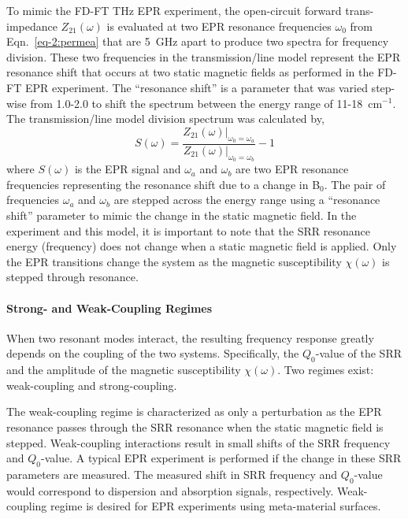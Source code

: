 To mimic the FD-FT THz EPR experiment, the open-circuit forward trans-impedance $Z_{21}(\omega)$ is evaluated at two EPR resonance frequencies $\omega_0$ from Eqn.~\ref{eq-2:permea} that are 5~GHz apart to produce two spectra for frequency division. These two frequencies in the transmission\-/line model represent the EPR resonance shift that occurs at two static magnetic fields as performed in the FD-FT EPR experiment. The ``resonance shift'' is a parameter that was varied step-wise from 1.0-2.0 to shift the spectrum between the energy range of 11-18~cm$^{-1}$. The transmission\-/line model division spectrum was calculated by, 
\begin{equation}
    S(\omega) = \frac{Z_{21}(\omega)\Bigr\rvert_{\omega_0 = \omega_a}}{Z_{21}(\omega)\Bigr\rvert_{\omega_0 = \omega_b}} - 1
\end{equation}
where $S(\omega)$ is the EPR signal and $\omega_a$ and $\omega_b$ are two EPR resonance frequencies representing the resonance shift due to a change in B$_0$. The pair of frequencies $\omega_a$ and $\omega_b$ are stepped across the energy range using a ``resonance shift'' parameter to mimic the change in the static magnetic field. In the experiment and this model, it is important to note that the SRR resonance energy (frequency) does not change when a static magnetic field is applied. Only the EPR transitions change the system as the magnetic susceptibility $\chi(\omega)$ is stepped through resonance.

\noindent \paragraph*{Strong- and Weak-Coupling Regimes}
When two resonant modes interact, the resulting frequency response greatly depends on the coupling of the two systems. Specifically, the $Q_0$-value of the SRR and the amplitude of the magnetic susceptibility $\chi(\omega)$. Two regimes exist: weak-coupling and strong-coupling. 

The weak-coupling regime is characterized as only a perturbation as the EPR resonance passes through the SRR resonance when the static magnetic field is stepped. Weak-coupling interactions result in small shifts of the SRR frequency and $Q_0$-value. A typical EPR experiment is performed if the change in these SRR parameters are measured. The measured shift in SRR frequency and $Q_0$-value would correspond to dispersion and absorption signals, respectively. \cite{abragam1961, poole} Weak-coupling regime is desired for EPR experiments using meta-material surfaces.

